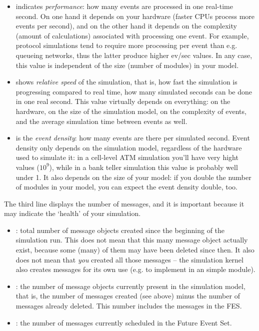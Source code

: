 \begin{itemize}
   \item{ indicates \textit{performance}: how many events are processed
     in one real-time second.  On one hand it depends on your hardware
     (faster CPUs process more events per second), and on the other hand
     it depends on the complexity (amount of calculations) associated
     with processing one event. For example, protocol simulations tend to require
     more processing per event than e.g. queueing networks, thus
     the latter produce higher ev/sec values.
     In any case, this value is independent of the size (number of modules) in your model.}
   \item{ shows \textit{relative speed} of the simulation, that is,
     how fast the simulation is progressing compared to real time, how many
     simulated seconds can be done in one real second. This value virtually depends
     on everything: on the hardware, on the size of the simulation model,
     on the complexity of events, and the average simulation time between events as well.}
   \item{ is the \textit{event density}: how many events are
     there per simulated second. Event density only depends on the simulation model,
     regardless of the hardware used to simulate it: in a cell-level ATM simulation
     you'll have very hight values ($10^9$), while in a bank teller simulation
     this value is probably well under 1. It also depends on the size of your
     model: if you double the number of modules in your model, you can expect
     the event density double, too.}
\end{itemize}

The third line displays the number of messages, and it is important
because it may indicate the `health' of your simulation.

\begin{itemize}
   \item{: total number of message objects created since the
     beginning of the simulation run. This does not mean that this many message
     object actually exist, because some (many) of them may have been deleted
     since then. It also does not mean that \textit{you} created all those
     messages -- the simulation kernel also creates messages for its own use
     (e.g. to implement  in an  simple module).}
   \item{: the number of message objects currently present
     in the simulation model, that is, the number of messages created (see above)
     minus the number of messages already deleted. This number includes
     the messages in the FES.}
   \item{: the number of messages currently scheduled in the
     Future Event Set.}
\end{itemize}


